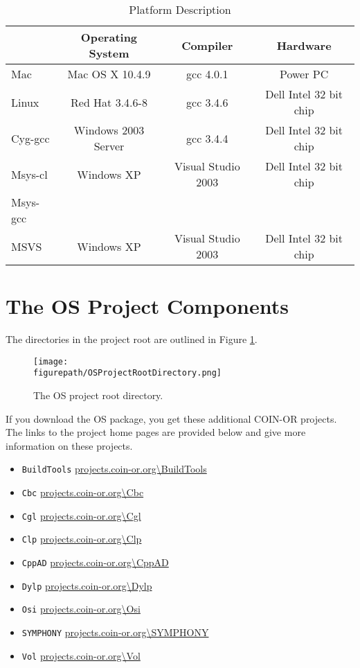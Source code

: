 \documentclass[11pt]{article}
\newcommand{\figurepath}{./figures}
\newcounter{Fig}
\renewcommand{\_}{{\char"5F}}
\renewcommand{\{}{{\char"7B}}
\renewcommand{\}}{{\char"7D}}
\renewcommand{\^}{{\char"0D}}
\renewcommand{\'}{{\char"0D}}
\begin{document}
 \begin{table}
\caption{Platform Description}
\centering
\label{table:platformdescription}
\vskip 8pt
 \begin{tabular}{l|c|c|c|}
 & {\bf Operating System} & {\bf Compiler} & {\bf  Hardware} \\ \hline
 Mac &Mac OS X 10.4.9&gcc 4.0.1&Power PC \\   \hline
 Linux &Red Hat 3.4.6-8&gcc 3.4.6& Dell Intel 32 bit chip\\ \hline
 Cyg-gcc &Windows 2003 Server&gcc 3.4.4& Dell Intel 32 bit chip \\ \hline
 Msys-cl &Windows XP&Visual Studio 2003 &Dell Intel 32 bit chip \\ \hline
 Msys-gcc &&& \\ \hline
 MSVS &Windows XP&Visual Studio 2003 &Dell Intel 32 bit chip \\ \hline
\end{tabular}
\end{table}
 

\section{The OS Project Components}\label{section:projectcomponents}

The directories in the  project root  are outlined in Figure  \ref{figure:osprojectrootdir}.

\begin{figure}
\centering
\texttt{[image: \\figurepath/OSProjectRootDirectory.png]}
\caption{The OS project root directory.} 
\label{figure:osprojectrootdir}
\end{figure}

If you download the OS package, you get these additional COIN-OR projects. The links to the project home pages are provided below and give more information on these projects. 
\begin{itemize}
\item {\tt BuildTools} \url{projects.coin-or.org\BuildTools}
\item {\tt Cbc} \url{projects.coin-or.org\Cbc}
\item {\tt Cgl} \url{projects.coin-or.org\Cgl}
\item {\tt Clp}  \url{projects.coin-or.org\Clp}
\item {\tt CppAD} \url{projects.coin-or.org\CppAD}
\item {\tt Dylp} \url{projects.coin-or.org\Dylp}
\item {\tt Osi} \url{projects.coin-or.org\Osi}
\item {\tt SYMPHONY}   \url{projects.coin-or.org\SYMPHONY}
\item {\tt Vol}   \url{projects.coin-or.org\Vol}
\end{itemize}
\end{document}
